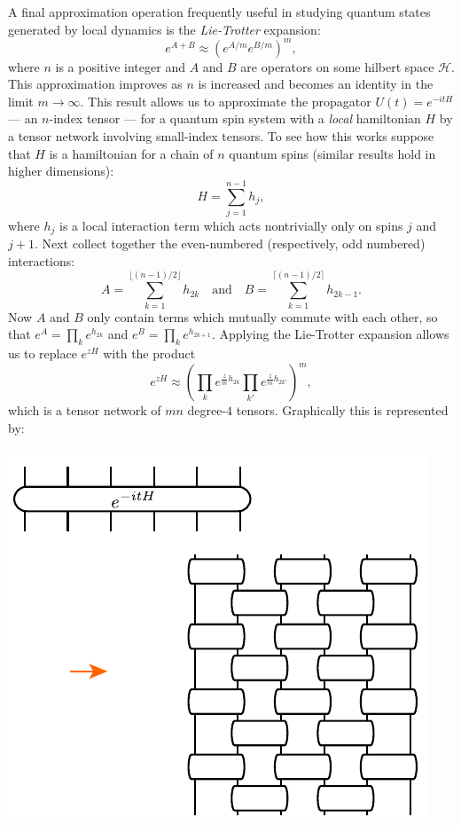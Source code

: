 \documentclass[twocolumn,lengthcheck,superscriptaddress]{revtex4-1}
\theoremstyle{definition}
\theoremstyle{remark}
\begin{document}
A final approximation operation frequently useful in studying quantum states generated by local dynamics is the \emph{Lie-Trotter} expansion:
\begin{equation}
	e^{A+B} \approx (e^{A/m}e^{B/m})^m,
\end{equation}
where $n$ is a positive integer and $A$ and $B$ are operators on some hilbert space $\mathcal{H}$. This approximation improves as $n$ is increased and becomes an identity in the limit $m\rightarrow \infty$. This result allows us to approximate the propagator $U(t) = e^{-itH}$ --- an $n$-index tensor --- for a quantum spin system with a \emph{local} hamiltonian $H$ by a tensor network involving small-index tensors. To see how this works suppose that $H$ is a hamiltonian for a chain of $n$ quantum spins (similar results hold in higher dimensions):
\begin{equation}
	H = \sum_{j=1}^{n-1} h_j,
\end{equation}
where $h_{j}$ is a local interaction term which acts nontrivially only on spins $j$ and $j+1$. Next collect together the even-numbered (respectively, odd numbered) interactions:
\begin{equation}
	A = \sum_{k=1}^{\lfloor (n-1)/2 \rfloor} h_{2k} \quad \text{and} \quad B = \sum_{k=1}^{\lceil (n-1)/2 \rceil} h_{2k-1}.
\end{equation} 
Now $A$ and $B$ only contain terms which mutually commute with each other, so that $e^{A} = \prod_{k} e^{h_{2k}}$ and $e^{B} = \prod_{k} e^{h_{2k+1}}$. Applying the Lie-Trotter expansion allows us to replace $e^{zH}$ with the product
\begin{equation}
	e^{zH} \approx \left(\prod_{k} e^{\frac{z}{m}h_{2k}}\prod_{k'} e^{\frac{z}{m}h_{2k'}}\right)^m,
\end{equation}
which is a tensor network of $mn$ degree-$4$ tensors. Graphically this is represented by: 
\begin{center}
\includegraphics{lietrotter.pdf}
\end{center}
\end{document}
